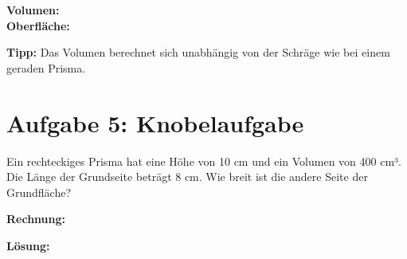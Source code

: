 \vspace{1cm}

\textbf{Volumen:} \\
\textbf{Oberfläche:}

\vspace{1cm}
\textbf{Tipp:} Das Volumen berechnet sich unabhängig von der Schräge wie bei einem geraden Prisma.

\newpage

\section*{Aufgabe 5: Knobelaufgabe}

Ein rechteckiges Prisma hat eine Höhe von 10 cm und ein Volumen von 400 cm³. Die Länge der Grundseite beträgt 8 cm. Wie breit ist die andere Seite der Grundfläche?

\vspace{1cm}
\textbf{Rechnung:} 

\vspace{0.5cm}
\textbf{Lösung:}
